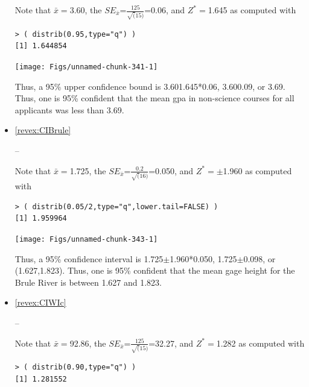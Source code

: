 \documentclass[10pt,openany]{book}\usepackage[]{graphicx}\usepackage[]{color}
\makeatletter
\newenvironment{kframe}{%
 \def\at@end@of@kframe{}%
 \ifinner\ifhmode%
  \def\at@end@of@kframe{\end{minipage}}%
  \begin{minipage}{\columnwidth}%
 \fi\fi%
 \def\FrameCommand##1{\hskip\@totalleftmargin \hskip-\fboxsep
 \colorbox{shadecolor}{##1}\hskip-\fboxsep
     \hskip-\linewidth \hskip-\@totalleftmargin \hskip\columnwidth}%
 \MakeFramed {\advance\hsize-\width
   \@totalleftmargin\z@ \linewidth\hsize
   \@setminipage}}%
 {\par\unskip\endMakeFramed%
 \at@end@of@kframe}
\newenvironment{knitrout}{}{} %
\makeatother
\begin{document}
\begin{itemize}
Note that $\bar{x}=$3.60, the $SE_{\bar{x}}$=$\frac{125}{\sqrt(15)}$=0.06, and $Z^{*}=$1.645 as computed with
\begin{knitrout}
\color{fgcolor}\begin{kframe}
\begin{verbatim}
> ( distrib(0.95,type="q") )
[1] 1.644854
\end{verbatim}
\end{kframe}

{\centering \texttt{[image: Figs/unnamed-chunk-341-1]} 

}



\end{knitrout}
Thus, a 95\% upper confidence bound is 3.601.645*0.06, 3.600.09, or 3.69.  Thus, one is 95\% confident that the mean gpa in non-science courses for all applicants was less than 3.69.
  \item \hypertarget{ans:CIBrule}{\ref{revex:CIBrule}} --

Note that $\bar{x}=$1.725, the $SE_{\bar{x}}$=$\frac{0.2}{\sqrt(16)}$=0.050, and $Z^{*}=\pm$1.960 as computed with
\begin{knitrout}
\color{fgcolor}\begin{kframe}
\begin{verbatim}
> ( distrib(0.05/2,type="q",lower.tail=FALSE) )
[1] 1.959964
\end{verbatim}
\end{kframe}

{\centering \texttt{[image: Figs/unnamed-chunk-343-1]} 

}



\end{knitrout}
Thus, a 95\% confidence interval is 1.725$\pm$1.960*0.050, 1.725$\pm$0.098, or (1.627,1.823).  Thus, one is 95\% confident that the mean gage height for the Brule River is between 1.627 and 1.823.
  \item \hypertarget{ans:CIWIc}{\ref{revex:CIWIc}} --

Note that $\bar{x}=$92.86, the $SE_{\bar{x}}$=$\frac{125}{\sqrt(15)}$=32.27, and $Z^{*}=$1.282 as computed with
\begin{knitrout}
\color{fgcolor}\begin{kframe}
\begin{verbatim}
> ( distrib(0.90,type="q") )
[1] 1.281552
\end{verbatim}
\end{kframe}


\end{knitrout}
\end{itemize}
\end{document}
